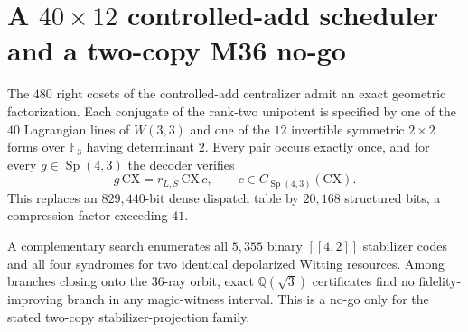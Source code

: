 \section*{A $40\times12$ controlled-add scheduler and a two-copy M36 no-go}
The $480$ right cosets of the controlled-add centralizer admit an exact geometric
factorization. Each conjugate of the rank-two unipotent is specified by one of the
$40$ Lagrangian lines of $W(3,3)$ and one of the $12$ invertible symmetric
$2\times2$ forms over $\mathbb F_3$ having determinant $2$. Every pair occurs
exactly once, and for every $g\in\operatorname{Sp}(4,3)$ the decoder verifies
\[
 g\,\mathrm{CX}=r_{L,S}\,\mathrm{CX}\,c,
 \qquad c\in C_{\operatorname{Sp}(4,3)}(\mathrm{CX}).
\]
This replaces an $829{,}440$-bit dense dispatch table by $20{,}168$ structured
bits, a compression factor exceeding $41$.

A complementary search enumerates all $5{,}355$ binary $[[4,2]]$ stabilizer codes
and all four syndromes for two identical depolarized Witting resources. Among
branches closing onto the $36$-ray orbit, exact $\mathbb Q(\sqrt3)$ certificates
find no fidelity-improving branch in any magic-witness interval. This is a no-go
only for the stated two-copy stabilizer-projection family.
